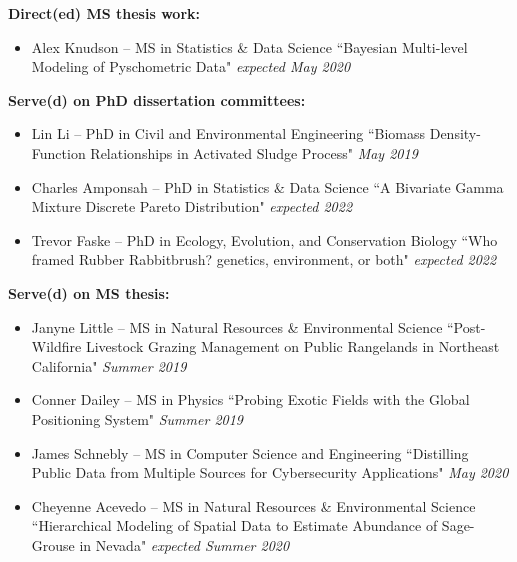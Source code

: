 \documentclass[paper=a4,fontsize=11pt]{scrartcl} %
\newcommand{\ThesisEntry}[5]{
		\noindent #1 -- #2 #3 ``#4" \textit{#5}}
\begin{document}
\noindent \textbf{Direct(ed) MS thesis work:}

\begin{itemize}[noitemsep]

  \item \ThesisEntry{Alex Knudson}{MS in Statistics \& Data Science}{}{Bayesian Multi-level Modeling of Pyschometric Data}{expected May 2020}

  \end{itemize}

\noindent \textbf{Serve(d) on PhD dissertation committees:}
  
\begin{itemize}[noitemsep]

        \item \ThesisEntry{Lin Li}{PhD in Civil and Environmental Engineering}{}{Biomass Density-Function Relationships in Activated Sludge Process}{May 2019}

\item \ThesisEntry{Charles Amponsah}{PhD in Statistics \& Data Science}{}{A Bivariate Gamma Mixture Discrete Pareto Distribution}{expected 2022}
    
  \item \ThesisEntry{Trevor Faske}{PhD in Ecology, Evolution, and Conservation Biology}{}{Who framed Rubber Rabbitbrush? genetics, environment, or both}{expected 2022}

  \end{itemize}
  
  \noindent \textbf{Serve(d) on MS thesis:}

  \begin{itemize}[noitemsep]
    

\item \ThesisEntry{Janyne Little}{MS in Natural Resources \& Environmental Science}{}{Post-Wildfire Livestock Grazing Management on Public Rangelands in Northeast California}{Summer 2019}

  \item \ThesisEntry{Conner Dailey}{MS in Physics}{}{Probing Exotic Fields with the Global Positioning System}{Summer 2019}

  \item \ThesisEntry{James Schnebly}{MS in Computer Science and Engineering}{}{Distilling Public Data from Multiple Sources for Cybersecurity Applications}{May 2020}

          \item \ThesisEntry{Cheyenne Acevedo}{MS in Natural Resources \& Environmental Science}{}{Hierarchical Modeling of Spatial Data to Estimate Abundance of Sage-Grouse in Nevada}{expected Summer 2020}

  
  \end{itemize}
\end{document}
